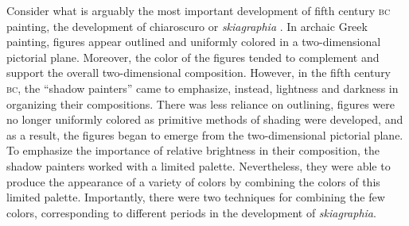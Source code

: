 Consider what is arguably the most important development of fifth century \textsc{bc} painting, the development of chiaroscuro or \emph{skiagraphia} \citep[see][]{Bruno:1977fk,Keuls:1975uq,Pemberton:1976kx}. In archaic Greek painting, figures appear outlined and uniformly colored in a two-dimensional pictorial plane. Moreover, the color of the figures tended to complement and support the overall two-dimensional composition. However, in the fifth century \textsc{bc}, the ``shadow painters'' came to emphasize, instead, lightness and darkness in organizing their compositions. There was less reliance on outlining, figures were no longer uniformly colored as primitive methods of shading were developed, and as a result, the figures began to emerge from the two-dimensional pictorial plane. To emphasize the importance of relative brightness in their composition, the shadow painters worked with a limited palette. Nevertheless, they were able to produce the appearance of a variety of colors by combining the colors of this limited palette. Importantly, there were two techniques for combining the few colors, corresponding to different periods in the development of \emph{skiagraphia}.

